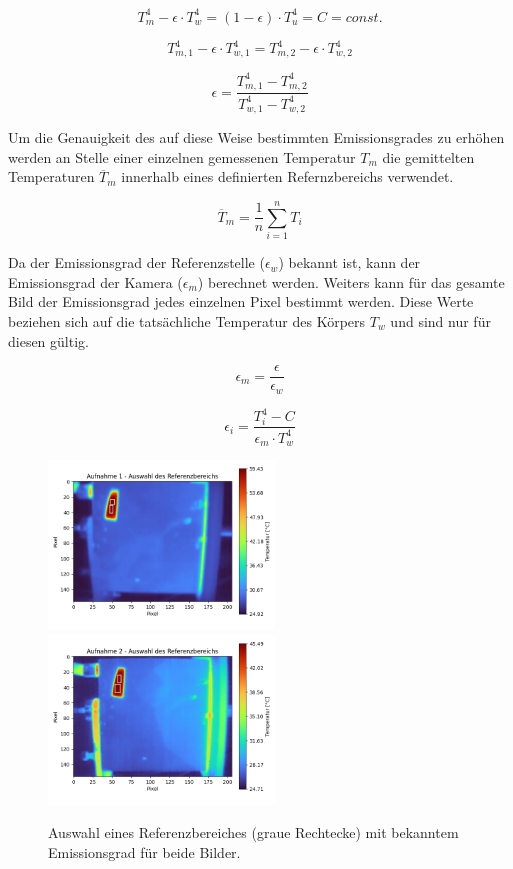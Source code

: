 \documentclass[10pt,a4paper,german]{article}
\begin{document}
\begin{equation}
    T_m^4 - \epsilon \cdot T_w^4 = (1 - \epsilon) \cdot T_u^4 = C = \textit{const.}
\end{equation}

\begin{equation}
    T_{m,1}^4 - \epsilon \cdot T_{w,1}^4 = T_{m,2}^4 - \epsilon \cdot T_{w,2}^4 
\end{equation}

\begin{equation}
    \epsilon = \frac{T_{m,1}^4 - T_{m,2}^4}{T_{w,1}^4 - T_{w,2}^4}
\end{equation}

Um die Genauigkeit des auf diese Weise bestimmten Emissionsgrades zu erhöhen werden an Stelle einer einzelnen gemessenen Temperatur $T_m$ die gemittelten Temperaturen $\overline T_m$ innerhalb eines definierten Refernzbereichs verwendet.

\begin{equation}
    \overline T_m = \frac{1}{n} \sum_{i=1}^n T_i
\end{equation}

Da der Emissionsgrad der Referenzstelle ($\epsilon_{w}$) bekannt ist, kann der Emissionsgrad der Kamera ($\epsilon_{m}$) berechnet werden.
Weiters kann für das gesamte Bild der Emissionsgrad jedes einzelnen Pixel bestimmt werden.
Diese Werte beziehen sich auf die tatsächliche Temperatur des Körpers $T_w$ und sind nur für diesen gültig.

\begin{equation}
    \epsilon_{m} = \frac{\epsilon}{\epsilon_{w}}
\end{equation}

\begin{equation}
    \epsilon_i = \frac{T_i^4 - C}{\epsilon_{m} \cdot T_w^4}
\end{equation}

\begin{figure}[H]
    \centering
    \captionsetup{width=12cm}
    \includegraphics[width=6cm]{img/ref_sel_1.png}
    \includegraphics[width=6cm]{img/ref_sel_2.png}
    \caption{Auswahl eines Referenzbereiches (graue Rechtecke) mit bekanntem Emissionsgrad für beide Bilder.}
\end{figure}
\end{document}
